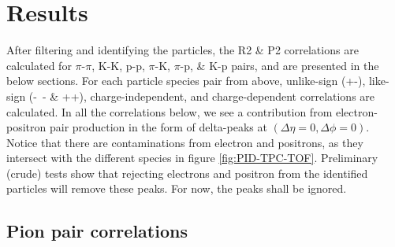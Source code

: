\documentclass[12pt,a4paper,twoside]{report}
\begin{document}
\chapter{Results}\label{Ch:Results}
After filtering and identifying the particles, the R2 \& P2 correlations are calculated for $\pi$-$\pi$, K-K, p-p, $\pi$-K, $\pi$-p, \& K-p pairs, and are presented in the below sections. For each particle species pair from above, unlike-sign (+-), like-sign (-\ - \& ++), charge-independent, and charge-dependent correlations are calculated. In all the correlations below, we see a contribution from electron-positron pair production in the form of delta-peaks at $(\Delta\eta=0,\Delta\phi=0)$. Notice that there are contaminations from electron and positrons, as they intersect with the different species in figure \ref{fig:PID-TPC-TOF}. Preliminary (crude) tests show that rejecting electrons and positron from the identified particles will remove these peaks. For now, the peaks shall be ignored.
\section{Pion pair correlations}
\end{document}
